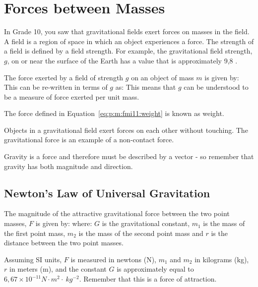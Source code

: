 \section{Forces between Masses}

In Grade 10, you saw that gravitational fields exert forces on masses in the field. A field is a region of space in which an object experiences a force. The strength of a field is defined by a field strength. For example, the gravitational field strength, $g$, on or near the surface of the Earth has a value that is approximately 9,8 \mss.

The force exerted by a field of strength $g$ on an object of mass $m$ is given by:
This can be re-written in terms of $g$ as:
This means that $g$ can be understood to be a measure of force exerted per unit mass.

The force defined in Equation~\ref{eq:p:m:fmi11:weight} is known as weight.

Objects in a gravitational field exert forces on each other without touching. The gravitational force is an example of a non-contact force.

Gravity is a force and therefore must be described by a vector - so remember that gravity has both magnitude and direction.

\subsection{Newton's Law of Universal Gravitation}


The magnitude of the attractive gravitational force between the two point masses, $F$ is given by:
where:
$G$ is the gravitational constant, $m_1$ is the mass of the first point mass, $m_2$ is the mass of the second point mass and $r$ is the distance between the two point masses.

Assuming SI units, $F$ is measured in newtons (N), $m_1$ and $m_2$ in kilograms (kg), $r$ in meters (m), and the constant $G$ is approximately equal to $6,67 \times 10^{-11} N\cdot m^2\cdot~kg^{-2}$. Remember that this is a force of attraction.

